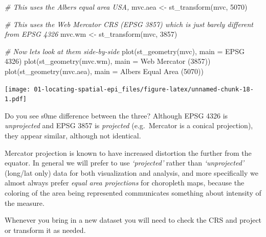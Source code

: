 \documentclass[
]{book}
\newenvironment{Shaded}{\begin{snugshade}}{\end{snugshade}}
\newcommand{\AttributeTok}[1]{\textcolor[rgb]{0.77,0.63,0.00}{#1}}
\newcommand{\CommentTok}[1]{\textcolor[rgb]{0.56,0.35,0.01}{\textit{#1}}}
\newcommand{\DecValTok}[1]{\textcolor[rgb]{0.00,0.00,0.81}{#1}}
\newcommand{\FunctionTok}[1]{\textcolor[rgb]{0.00,0.00,0.00}{#1}}
\newcommand{\NormalTok}[1]{#1}
\newcommand{\OtherTok}[1]{\textcolor[rgb]{0.56,0.35,0.01}{#1}}
\newcommand{\StringTok}[1]{\textcolor[rgb]{0.31,0.60,0.02}{#1}}
\begin{document}
\begin{Shaded}
\begin{Highlighting}[]
\CommentTok{\# This uses the Albers equal area USA, }
\NormalTok{mvc.aea }\OtherTok{\textless{}{-}} \FunctionTok{st\_transform}\NormalTok{(mvc, }\DecValTok{5070}\NormalTok{)}

\CommentTok{\# This uses the Web Mercator CRS (EPSG 3857) which is just barely different from EPSG 4326}
\NormalTok{mvc.wm }\OtherTok{\textless{}{-}} \FunctionTok{st\_transform}\NormalTok{(mvc, }\DecValTok{3857}\NormalTok{)}

\CommentTok{\# Now let\textquotesingle{}s look at them side{-}by{-}side}
\FunctionTok{plot}\NormalTok{(}\FunctionTok{st\_geometry}\NormalTok{(mvc), }\AttributeTok{main =} \StringTok{\textquotesingle{}EPSG 4326\textquotesingle{}}\NormalTok{)}
\FunctionTok{plot}\NormalTok{(}\FunctionTok{st\_geometry}\NormalTok{(mvc.wm), }\AttributeTok{main =} \StringTok{\textquotesingle{}Web Mercator (3857)\textquotesingle{}}\NormalTok{)}
\FunctionTok{plot}\NormalTok{(}\FunctionTok{st\_geometry}\NormalTok{(mvc.aea), }\AttributeTok{main =} \StringTok{\textquotesingle{}Albers Equal Area (5070)\textquotesingle{}}\NormalTok{)}
\end{Highlighting}
\end{Shaded}

\texttt{[image: 01-locating-spatial-epi\_files/figure-latex/unnamed-chunk-18-1.pdf]}

Do you see s0me difference between the three? Although EPSG 4326 is \emph{unprojected} and EPSG 3857 is \emph{projected} (e.g.~Mercator is a conical projection), they appear similar, although not identical.

Mercator projection is known to have increased distortion the further from the equator. In general we will prefer to use \emph{`projected'} rather than \emph{`unprojected'} (long/lat only) data for both visualization and analysis, and more specifically we almost always prefer \emph{equal area projections} for choropleth maps, because the coloring of the area being represented communicates something about intensity of the measure.

Whenever you bring in a new dataset you will need to check the CRS and project or transform it as needed.
\end{document}
